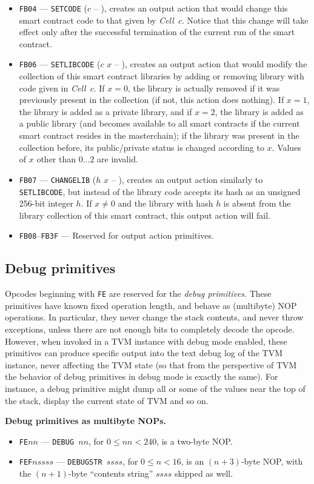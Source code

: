 \documentclass[12pt,oneside]{article}
\def\makepoint#1{\medbreak\noindent{\bf #1.\ }}
\def\nxsubpoint{\refstepcounter{subsubsection}%
    \smallbreak\makepoint{\thesubsubsection}}
\def\emb#1{\textbf{#1.}}
\def\mysubsection#1{

    \subsection{#1}\fancyhead[C]{\small{\textsc{\textrm{\thesubsection.} #1}}}}
\begin{document}
\begin{itemize}
\item {\tt FB04} --- {\tt SETCODE} ($c$ -- ), creates an output action that would change this smart contract code to that given by {\em Cell\/}~$c$. Notice that this change will take effect only after the successful termination of the current run of the smart contract.
\item {\tt FB06} --- {\tt SETLIBCODE} ($c$ $x$ -- ), creates an output action that would modify the collection of this smart contract libraries by adding or removing library with code given in {\em Cell\/}~$c$. If $x=0$, the library is actually removed if it was previously present in the collection (if not, this action does nothing). If $x=1$, the library is added as a private library, and if $x=2$, the library is added as a public library (and becomes available to all smart contracts if the current smart contract resides in the masterchain); if the library was present in the collection before, its public/private status is changed according to $x$. Values of $x$ other than $0\ldots 2$ are invalid.
\item {\tt FB07} --- {\tt CHANGELIB} ($h$ $x$ -- ), creates an output action similarly to {\tt SETLIBCODE}, but instead of the library code accepts its hash as an unsigned 256-bit integer $h$. If $x\neq0$ and the library with hash $h$ is absent from the library collection of this smart contract, this output action will fail.
\item {\tt FB08}--{\tt FB3F} --- Reserved for output action primitives.
\end{itemize}

\mysubsection{Debug primitives}\label{p:prim.debug}
Opcodes beginning with {\tt FE} are reserved for the {\em debug primitives}. These primitives have known fixed operation length, and behave as (multibyte) NOP operations. In particular, they never change the stack contents, and never throw exceptions, unless there are not enough bits to completely decode the opcode. However, when invoked in a TVM instance with debug mode enabled, these primitives can produce specific output into the text debug log of the TVM instance, never affecting the TVM state (so that from the perspective of TVM the behavior of debug primitives in debug mode is exactly the same). For instance, a debug primitive might dump all or some of the values near the top of the stack, display the current state of TVM and so on.

\nxsubpoint\emb{Debug primitives as multibyte NOPs}
\begin{itemize}
\item {\tt FE$nn$} --- {\tt DEBUG $nn$}, for $0\leq nn<240$, is a two-byte NOP.
\item {\tt FEF$nssss$} --- {\tt DEBUGSTR $ssss$}, for $0\leq n<16$, is an $(n+3)$-byte NOP, with the $(n+1)$-byte ``contents string'' $ssss$ skipped as well.
\end{itemize}
\end{document}
